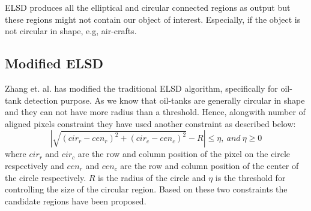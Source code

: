 \par ELSD produces all the elliptical and circular connected regions as output but these regions might not contain our object of interest. Especially, if the object is not circular in shape, e.g, air-crafts. 

\subsection{Modified ELSD}
Zhang et. al. \cite{b6} has modified the traditional ELSD algorithm, specifically for oil-tank detection purpose. As we know that oil-tanks are generally circular in shape and they can not have more radius than a threshold. Hence, alongwith number of aligned pixels constraint they have used another constraint as described below: $$| \sqrt{(cir_r-cen_r)^2+(cir_c-cen_c)^2}-R|\leq \eta,\ and\ \eta \geq 0$$
where $cir_r$ and $cir_c$ are the row and column position of the pixel on the circle respectively and $cen_r$ and $cen_c$ are the row and column position of the center of the circle respectively. $R$ is the radius of the circle and $\eta$ is the threshold for controlling the size of the circular region. Based on these two constraints the candidate regions have been proposed.


